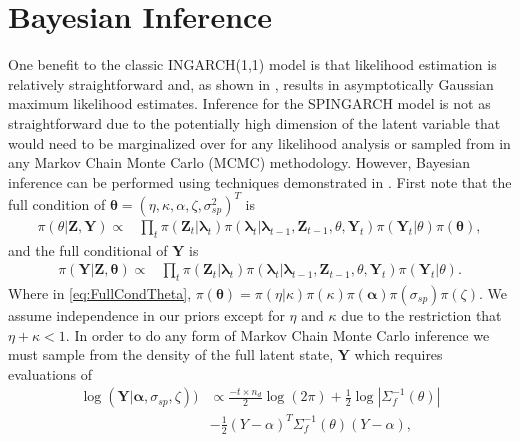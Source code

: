 \documentclass[11pt]{isuthesis}
\begin{document}
\section{Bayesian Inference}\label{Sec:Bayes}
One benefit to the classic INGARCH(1,1) model is that likelihood estimation is relatively straightforward and, as shown in \cite{fokianos2009poisson}, results in asymptotically Gaussian maximum likelihood estimates.  Inference for the SPINGARCH model is not as straightforward due to the potentially high dimension of the latent variable that would need to be marginalized over for any likelihood analysis or sampled from in any Markov Chain Monte Carlo (MCMC) methodology.  However, Bayesian inference can be performed using techniques demonstrated in \cite{joseph}. First note that the full condition of $\boldsymbol{\theta}=\left(\eta,\kappa,\alpha,\zeta,\sigma^2_{sp}\right)^T$ is
\begin{align}
\pi(\theta | \boldsymbol{Z},\boldsymbol{Y})\propto &  \prod_t\pi(\boldsymbol{Z}_t|\boldsymbol{\lambda}_t)\pi(\boldsymbol{\lambda}_t|\boldsymbol{\lambda}_{t-1},\boldsymbol{Z}_{t-1},\theta,\boldsymbol{Y}_t)\pi(\boldsymbol{Y}_t|\theta)
\pi(\boldsymbol{\theta})\label{eq:FullCondTheta},
\end{align}
and the full conditional of $\boldsymbol{Y}$ is
\begin{align}
\pi(\boldsymbol{Y} | \boldsymbol{Z},\boldsymbol{\theta})\propto &  \prod_t\pi(\boldsymbol{Z}_t|\boldsymbol{\lambda}_t)\pi(\boldsymbol{\lambda}_t|\boldsymbol{\lambda}_{t-1},\boldsymbol{Z}_{t-1},\theta,\boldsymbol{Y}_t)\pi(\boldsymbol{Y}_t|\theta).
\end{align}
Where in \eqref{eq:FullCondTheta}, $\pi(\boldsymbol{\theta})=\pi(\eta|\kappa)\pi(\kappa)\pi(\boldsymbol{\alpha})\pi(\sigma_{sp})\pi(\zeta)$.  We assume independence in our priors except for $\eta$ and $\kappa$ due to the restriction that $\eta+\kappa <1$.  In order to do any form of Markov Chain Monte Carlo inference we must sample from the density of the full latent state, $\boldsymbol{Y}$ which requires evaluations of 
\begin{align}
\log(\boldsymbol{Y}|\boldsymbol{\alpha},\sigma_{sp},\zeta)) & \propto \frac{-t \times n_d}{2}\log(2 \pi) + \frac{1}{2} \log | \Sigma_f^{-1}(\theta)|\nonumber\\
& - \frac{1}{2}(Y-\alpha)^T\Sigma_f^{-1}(\theta)(Y-\alpha) \label{eq:log Y1},
\end{align}
\end{document}
